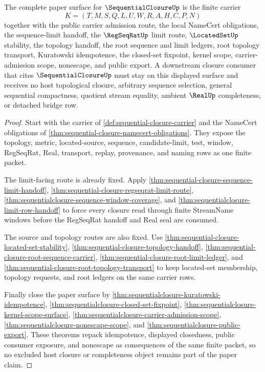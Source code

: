 \begin{theorem}
\label{thm:sequentialclosure-mature-treatment}
The complete paper surface for $\SequentialClosureUp$ is the finite carrier
$$
K=(T,M,S,Q,L,U,W,R,A,H,C,P,N)
$$
together with the public carrier admission route, the local NameCert obligations, the sequence-limit handoff, the $\RegSeqRatUp$ limit route, $\LocatedSetUp$ stability, the topology handoff, the root sequence and limit ledgers, root topology transport, Kuratowski idempotence, the closed-set fixpoint, kernel scope, carrier-admission scope, nonescape, and public export. A downstream closure consumer that cites $\SequentialClosureUp$ must stay on this displayed surface and receives no host topological closure, arbitrary sequence selection, general sequential compactness, quotient stream equality, ambient $\RealUp$ completeness, or detached bridge row.
\end{theorem}
\begin{proof}
Start with the carrier of \autoref{def:sequential-closure-carrier} and the NameCert obligations of \autoref{thm:sequential-closure-namecert-obligations}. They expose the topology, metric, located-source, sequence, candidate-limit, test, window, RegSeqRat, Real, transport, replay, provenance, and naming rows as one finite packet.

The limit-facing route is already fixed. Apply \autoref{thm:sequential-closure-sequence-limit-handoff}, \autoref{thm:sequential-closure-regseqrat-limit-route}, \autoref{thm:sequentialclosure-sequence-window-coverage}, and \autoref{thm:sequentialclosure-limit-row-handoff} to force every closure read through finite StreamName windows before the RegSeqRat handoff and Real seal are consumed.

The source and topology routes are also fixed. Use \autoref{thm:sequential-closure-located-set-stability}, \autoref{thm:sequential-closure-topology-handoff}, \autoref{thm:sequential-closure-root-sequence-carrier}, \autoref{thm:sequential-closure-root-limit-ledger}, and \autoref{thm:sequential-closure-root-topology-transport} to keep located-set membership, topology requests, and root ledgers on the same carrier rows.

Finally close the paper surface by \autoref{thm:sequentialclosure-kuratowski-idempotence}, \autoref{thm:sequentialclosure-closed-set-fixpoint}, \autoref{thm:sequentialclosure-kernel-scope-surface}, \autoref{thm:sequentialclosure-carrier-admission-scope}, \autoref{thm:sequentialclosure-nonescape-scope}, and \autoref{thm:sequentialclosure-public-export}. These theorems repack idempotence, displayed closedness, public consumer exposure, and nonescape as consequences of the same finite packet, so no excluded host closure or completeness object remains part of the paper claim.
\end{proof}

